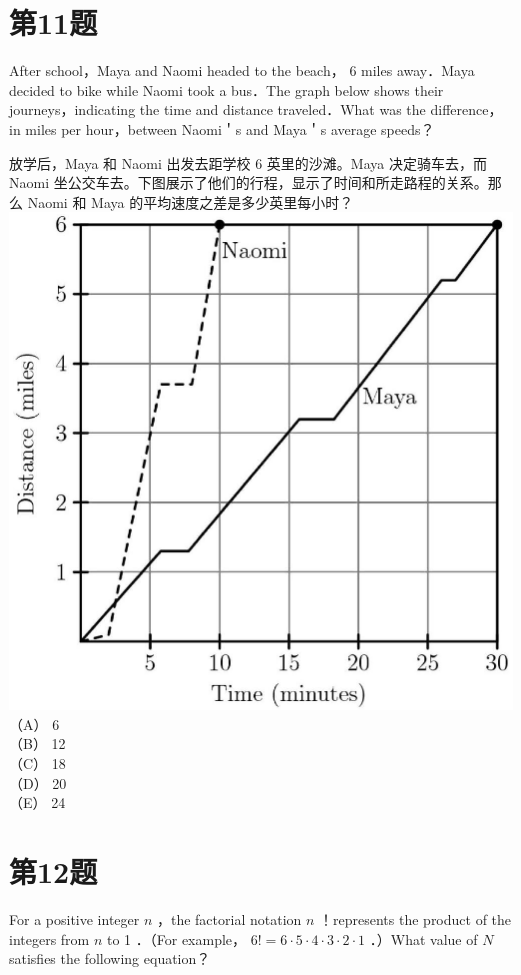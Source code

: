 \documentclass[10pt]{article}
\begin{document}
\section*{第11题}
After school，Maya and Naomi headed to the beach， 6 miles away．Maya decided to bike while Naomi took a bus．The graph below shows their journeys，indicating the time and distance traveled．What was the difference，in miles per hour，between Naomi＇s and Maya＇s average speeds？

放学后，Maya 和 Naomi 出发去距学校 6 英里的沙滩。Maya 决定骑车去，而 Naomi 坐公交车去。下图展示了他们的行程，显示了时间和所走路程的关系。那么 Naomi 和 Maya 的平均速度之差是多少英里每小时？\\
\includegraphics[max width=\textwidth, center]{2025_09_05_48544237b06df716137eg-06}\\
（A） 6\\
（B） 12\\
（C） 18\\
（D） 20\\
（E） 24

\section*{第12题}
For a positive integer $n$ ，the factorial notation $n$ ！represents the product of the integers from $n$ to 1 ．（For example， $6!=6 \cdot 5 \cdot 4 \cdot 3 \cdot 2 \cdot 1$ ．）What value of $N$ satisfies the following equation？
\end{document}
